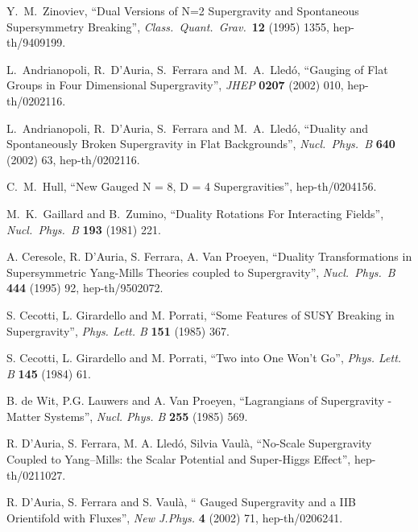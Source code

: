 \documentclass[a4paper,12pt]{article}
\begin{document}
\begin{thebibliography}{99}
 Y.~M.~Zinoviev,
``Dual Versions of N=2 Supergravity and Spontaneous Supersymmetry Breaking'',
{\it Class.\ Quant.\ Grav.}\ {\bf 12} (1995) 1355, hep-th/9409199. 

 L.~Andrianopoli, R.~D'Auria, S.~Ferrara and M.~A.~Lled\'o,
``Gauging of Flat Groups in Four Dimensional Supergravity'',
{\it JHEP} {\bf 0207} (2002) 010,
hep-th/0202116. 

 L.~Andrianopoli, R.~D'Auria, S.~Ferrara and M.~A.~Lled\'o,
``Duality and Spontaneously Broken Supergravity in Flat Backgrounds'', 
{\it Nucl.\ Phys.\  B} {\bf 640} (2002) 63,
hep-th/0202116. 

C.~M.~Hull,
``New Gauged N = 8, D = 4 Supergravities'',
hep-th/0204156.



 M.~K.~Gaillard and B.~Zumino,
``Duality Rotations For Interacting Fields'', {\it Nucl.\ Phys.\ B} {\bf 193} (1981) 221.



A. Ceresole, R. D'Auria, S. Ferrara, A. Van Proeyen, 
``Duality Transformations in Supersymmetric Yang-Mills Theories coupled to Supergravity'',
{\it Nucl.\ Phys.\  B} {\bf 444} (1995) 92, hep-th/9502072.


S. Cecotti, L. Girardello and M. Porrati, ``Some Features of SUSY Breaking 
in \coordHE{} Supergravity'', {\it
Phys. Lett. B} {\bf 151} (1985) 367.


S. Cecotti, L. Girardello and M. Porrati, ``Two into One Won't Go'', {\it
Phys. Lett. B} {\bf 145} (1984) 61.


 B. de Wit, P.G. Lauwers and  A. Van Proeyen, ``Lagrangians of \coordHE{}
Supergravity - Matter Systems'', {\it Nucl. Phys. B} {\bf 255} (1985) 569.
  



R. D'Auria, S. Ferrara, M. A. Lled\'o, Silvia Vaul\`a,
``No-Scale \coordHE{} Supergravity Coupled to Yang--Mills: the Scalar Potential and Super-Higgs Effect'',
hep-th/0211027. 



R. D'Auria, S. Ferrara and S. Vaul\`a, ``\coordHE{} Gauged Supergravity and a 
IIB Orientifold with Fluxes'', {\it New J.Phys.} {\bf 4} (2002) 71, hep-th/0206241.



\end{thebibliography}
\end{document}
